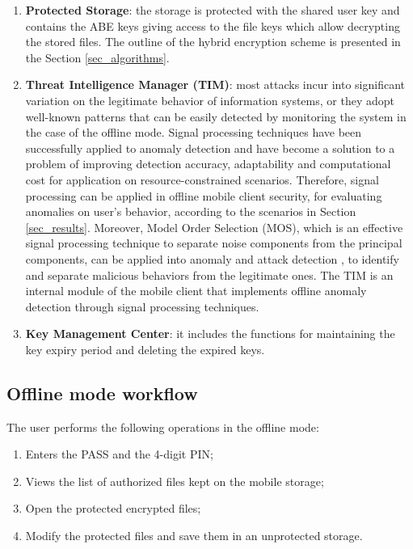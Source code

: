 \documentclass[twocolumn]{svjour3}          	%
\begin{document}
\begin{enumerate}
	\item \textbf{Protected Storage}: the storage is protected with the shared user key and contains the ABE keys giving access to the file keys which allow decrypting the stored files. The outline of the hybrid encryption scheme is presented in the Section \ref{sec_algorithms}.
	\item \textbf{Threat Intelligence Manager (TIM)}: most attacks incur into significant variation on the legitimate behavior of information systems, or they adopt well-known patterns that can be easily detected by monitoring the system in the case of the offline mode. Signal processing techniques have been successfully applied to anomaly detection \cite{lu2009network, huang2009signal} and have become a solution to a problem of improving detection accuracy, adaptability and computational cost for application on resource-constrained scenarios. Therefore, signal processing can be applied in offline mobile client security, for evaluating anomalies on user's behavior, according to the scenarios in Section \ref{sec_results}. Moreover, Model Order Selection (MOS), which is an effective signal processing technique to separate noise components from the principal components, can be applied into anomaly and attack detection \cite{tenorio2013greatest}, to identify and separate malicious behaviors from the legitimate ones. The TIM is an internal module of the mobile client that implements offline anomaly detection through signal processing techniques.
	\item \textbf{Key Management Center}: it includes the functions for maintaining the key expiry period and deleting the expired keys. 
\end{enumerate}

\subsection{Offline mode workflow}
\label{sec_offline_mode_workflow}

The user performs the following operations in the offline mode:

\begin{enumerate}
	\item Enters the PASS and the 4-digit PIN;
	\item Views the list of authorized files kept on the mobile storage;
	\item Open the protected encrypted files;
	\item Modify the protected files and save them in an unprotected storage.
\end{enumerate}
\end{document}
